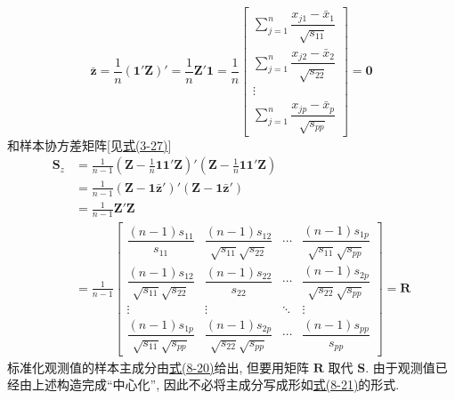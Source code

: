 
\label{eq:8-27}
\begin{equation}
\bar{\mathbf{z}}=\frac{1}{n}(\mathbf{1}'\mathbf{Z})'=\frac{1}{n}\mathbf{Z}'\mathbf{1}
=\frac{1}{n}\begin{bmatrix}
\sum\limits_{j=1}^{n}\dfrac{x_{j1}-\bar{x}_1}{\sqrt{s_{11}}}\\[12pt]
\sum\limits_{j=1}^{n}\dfrac{x_{j2}-\bar{x}_2}{\sqrt{s_{22}}}\\[12pt]
\vdots\\[4pt]
\sum\limits_{j=1}^{n}\dfrac{x_{jp}-\bar{x}_p}{\sqrt{s_{pp}}}
\end{bmatrix}=\mathbf{0} \tag{8-27}
\end{equation}
和样本协方差矩阵[见\hyperref[eq:3-27]{式(3-27)}]
\label{eq:8-28}
\begin{equation}
\begin{aligned}
\mathbf{S}_z&=\frac{1}{n-1}\left(\mathbf{Z}-\frac{1}{n}\mathbf{1}\mathbf{1}'\mathbf{Z}\right)'\left(\mathbf{Z}-\frac{1}{n}\mathbf{1}\mathbf{1}'\mathbf{Z}\right)\\[6pt]
&=\frac{1}{n-1}(\mathbf{Z}-\mathbf{1}\bar{\mathbf{z}}')'(\mathbf{Z}-\mathbf{1}\bar{\mathbf{z}}')\\[6pt]
&=\frac{1}{n-1}\mathbf{Z}'\mathbf{Z}\\[6pt]
&=\frac{1}{n-1}\begin{bmatrix}
\dfrac{(n-1)s_{11}}{s_{11}}&\dfrac{(n-1)s_{12}}{\sqrt{s_{11}}\sqrt{s_{22}}}&\cdots&\dfrac{(n-1)s_{1p}}{\sqrt{s_{11}}\sqrt{s_{pp}}}\\[12pt]
\dfrac{(n-1)s_{12}}{\sqrt{s_{11}}\sqrt{s_{22}}}&\dfrac{(n-1)s_{22}}{s_{22}}&\cdots&\dfrac{(n-1)s_{2p}}{\sqrt{s_{22}}\sqrt{s_{pp}}}\\[12pt]
\vdots&\vdots&\ddots&\vdots\\[4pt]
\dfrac{(n-1)s_{1p}}{\sqrt{s_{11}}\sqrt{s_{pp}}}&\dfrac{(n-1)s_{2p}}{\sqrt{s_{22}}\sqrt{s_{pp}}}&\cdots&\dfrac{(n-1)s_{pp}}{s_{pp}}
\end{bmatrix}=\mathbf{R}
\end{aligned}
\tag{8-28}
\end{equation}
标准化观测值的样本主成分由\hyperref[eq:8-20]{式(8-20)}给出, 但要用矩阵 $\mathbf{R}$ 取代 $\mathbf{S}$. 由于观测值已经由上述构造完成“中心化”, 因此不必将主成分写成形如\hyperref[eq:8-21]{式(8-21)}的形式.

